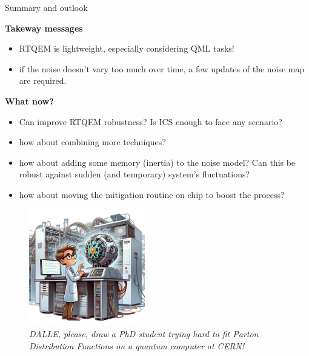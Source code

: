 \documentclass[8pt, xcolor={svgnames}, hyperref={linkcolor=black}, aspectratio=169]{beamer}
\begin{document}
\begin{frame}{Summary and outlook}
\begin{multicols}{2}
\textbf{Takeway messages}
\pause
\begin{itemize}[noitemsep]
\item[\faSend] RTQEM is lightweight, especially considering QML tasks!
\pause
\item[\faSend] if the noise doesn't vary too much over time, a few updates of 
the noise map are required.
\end{itemize}
\pause
\textbf{What now?}
\pause
\begin{itemize}[noitemsep]
\item[\faGamepad] Can improve RTQEM robustness? Is ICS enough to face any scenario?
\pause
\item[\faGamepad] how about combining more techniques?
\pause
\item[\faGamepad] how about adding some memory (inertia) to the noise model? Can this be 
robust against sudden (and temporary) system's fluctuations?
\pause
\item[\faGamepad] how about moving the mitigation routine on chip to boost the process?
\pause
\end{itemize}
\begin{figure}
    \includegraphics[width=0.45\textwidth]{figures/me.png}%
    \caption*{\textit{DALLE, please, draw a PhD student trying hard to fit Parton Distribution Functions on a quantum computer at CERN!}}
\end{figure}
\end{multicols}
\end{frame}
\end{document}
